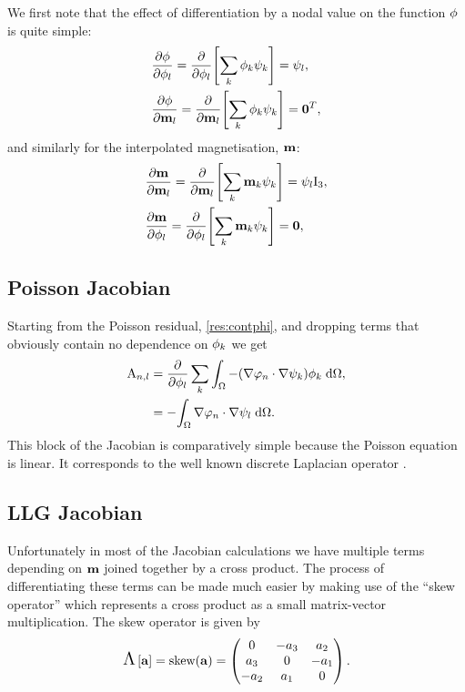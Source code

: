 We first note that the effect of differentiation by a nodal value on the function $\phi$ is quite simple:
\begin{equation}
  \begin{aligned}
    &\frac{\partial \phi}{\partial \phi_l} = \frac{\partial }{\partial \phi_l} {\left[  \sum_k \phi_k {\psi_k}  \right]} = \psi_l, \\
    &\frac{\partial \phi}{\partial \mathbf{m}_l} = \frac{\partial }{\partial \mathbf{m}_l} {\left[  \sum_k \phi_k {\psi_k}  \right]} = \mathbf{0}^T, \\
  \end{aligned}
\end{equation}
and similarly for the interpolated magnetisation, $\mathbf{m}$:
\begin{equation}
  \begin{aligned}
    &\frac{\partial \mathbf{m}}{\partial \mathbf{m}_l} = \frac{\partial }{\partial \mathbf{m}_l} {\left[  \sum_k \mathbf{m}_k {\psi_k}  \right]} = \psi_l \text{I}_3, \\
    &\frac{\partial \mathbf{m}}{\partial \phi_l} = \frac{\partial }{\partial \phi_l} {\left[  \sum_k \mathbf{m}_k {\psi_k}  \right]} = \mathbf{0}, \\
\end{aligned} 
\end{equation}

\subsection{Poisson Jacobian}
\label{sec:poisson-jacobian}

Starting from the Poisson residual, \cref{res:contphi}, and dropping terms that obviously contain no dependence on $\phi_k$ we get
\begin{equation}
  \begin{aligned}
    \label{eq:poisson-jacobian}
    \mathrm{A}_{n,l} &= \frac{\partial }{\partial \phi_{l}} \sum_k {\int_{\Omega} { -(\nabla \varphi_n \cdot \nabla \psi_k) \phi_{k}} {\; \mathrm{{d}}} {\Omega}}, \\
    &= -{\int_{\Omega} {\nabla \varphi_n \cdot \nabla \psi_l} {\; \mathrm{{d}}} {\Omega}}.
  \end{aligned}
\end{equation}
This block of the Jacobian is comparatively simple because the Poisson equation is linear. 
It corresponds to the well known discrete Laplacian operator \cite{HowardElmanDavidSilvester2006}.


\subsection{LLG Jacobian}
\label{sec:llg-jacobian}

Unfortunately in most of the Jacobian calculations we have multiple terms depending on $\mathbf{m}$ joined together by a cross product.
The process of differentiating these terms can be made much easier by making use of the ``skew operator'' which represents a cross product as a small matrix-vector multiplication.
The skew operator is given by
\begin{equation}
  \text{\Large{$\Lambda$}}\left[ {\mathbf{a}} \right] = \text{skew}({\mathbf{a}}) =
  \begin{pmatrix}
    0 & -a_3 & a_2 \\
    a_3 & 0 & -a_1 \\
    -a_2 & a_1 & 0
  \end{pmatrix}.
  \label{eqn:skew}
\end{equation}

